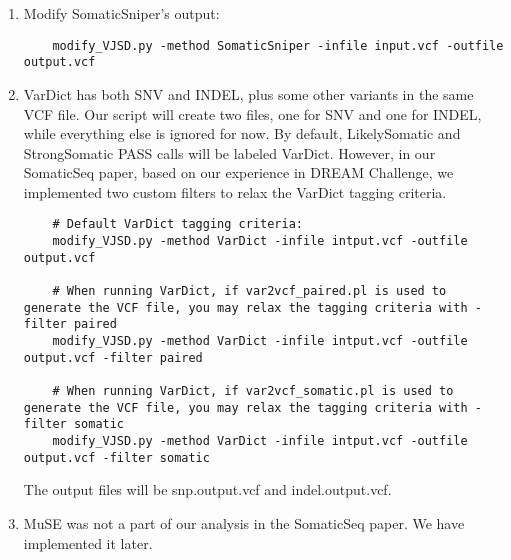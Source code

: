 \documentclass[10pt,letterpaper]{article}
\begin{document}
\begin{enumerate}
\begin{lstlisting}
	# This awk one-liner converts the text file into a basic VCF file
	awk -F "\t" '{print $1 "\t" $2 "\t.\t" $3 "\t" $4 "\t.\t.\tAAAB=" $10 ";AABB=" $11 "\tRD:AD\t" $5 ":" $6 "\t" $7 ":" $8}'
	\end{lstlisting}
	
	After that, you'll also want to sort the VCF file. Now, to modify that basic VCF into something that will be compatible with other VCF files under GATK CombineVariants:
	
	\begin{lstlisting}
	modify_VJSD.py -method JointSNVMix2 -infile input.vcf -outfile output.vcf
	\end{lstlisting}


	\item	
	Modify SomaticSniper's output:
	
	\begin{lstlisting}
	modify_VJSD.py -method SomaticSniper -infile input.vcf -outfile output.vcf
	\end{lstlisting}
	
	
	\item	
	VarDict has both SNV and INDEL, plus some other variants in the same VCF file. Our script will create two files, one for SNV and one for INDEL, while everything else is ignored for now. By default, LikelySomatic and StrongSomatic PASS calls will be labeled VarDict. However, in our SomaticSeq paper, based on our experience in DREAM Challenge, we implemented two custom filters to relax the VarDict tagging criteria. 
	
	\begin{lstlisting}
	# Default VarDict tagging criteria:
	modify_VJSD.py -method VarDict -infile intput.vcf -outfile output.vcf
	
	# When running VarDict, if var2vcf_paired.pl is used to generate the VCF file, you may relax the tagging criteria with -filter paired
	modify_VJSD.py -method VarDict -infile intput.vcf -outfile output.vcf -filter paired
	
	# When running VarDict, if var2vcf_somatic.pl is used to generate the VCF file, you may relax the tagging criteria with -filter somatic
	modify_VJSD.py -method VarDict -infile intput.vcf -outfile output.vcf -filter somatic
	\end{lstlisting}
	
	The output files will be snp.output.vcf and indel.output.vcf. 


	\item
	MuSE was not a part of our analysis in the SomaticSeq paper. We have implemented it later. 
	

\end{enumerate}
\end{document}
